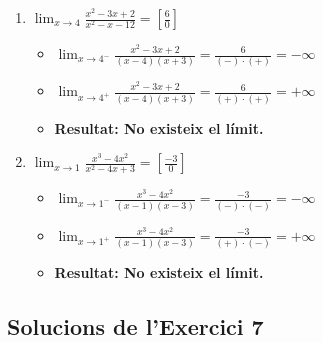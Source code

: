 \documentclass[12pt,a4paper]{article}
\begin{document}
\begin{enumerate}[label=6.\arabic*.]
    \item $\displaystyle \lim_{x \to 4} \frac{x^2-3x+2}{x^2-x-12} = \left[ \frac{6}{0} \right]$
    \begin{itemize}
        \item $\displaystyle \lim_{x \to 4^-} \frac{x^2-3x+2}{(x-4)(x+3)} = \frac{6}{(-)\cdot(+)} = -\infty$
        \item $\displaystyle \lim_{x \to 4^+} \frac{x^2-3x+2}{(x-4)(x+3)} = \frac{6}{(+)\cdot(+)} = +\infty$
        \item \textbf{Resultat: No existeix el límit.}
    \end{itemize}

    \item $\displaystyle \lim_{x \to 1} \frac{x^3-4x^2}{x^2-4x+3} = \left[ \frac{-3}{0} \right]$
    \begin{itemize}
        \item $\displaystyle \lim_{x \to 1^-} \frac{x^3-4x^2}{(x-1)(x-3)} = \frac{-3}{(-)\cdot(-)} = -\infty$
        \item $\displaystyle \lim_{x \to 1^+} \frac{x^3-4x^2}{(x-1)(x-3)} = \frac{-3}{(+)\cdot(-)} = +\infty$
        \item \textbf{Resultat: No existeix el límit.}
    \end{itemize}
\end{enumerate}

\subsection*{Solucions de l'Exercici 7}
\end{document}
